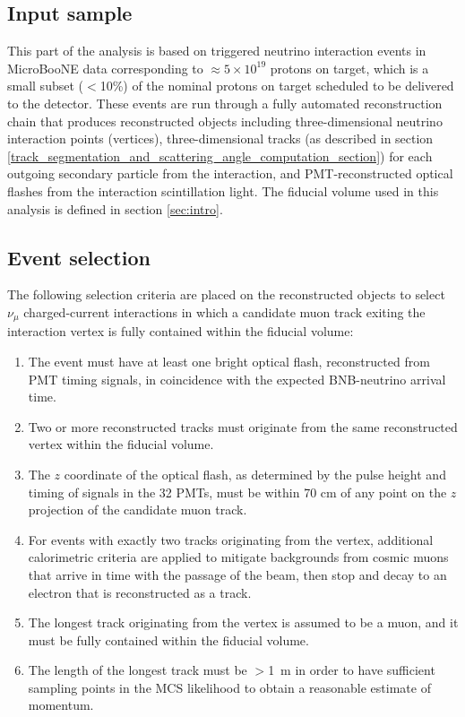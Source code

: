 \documentclass[a4paper,11pt]{article}
\begin{document}
\subsection{Input sample}\label{input_sample_section}
This part of the analysis is based on triggered neutrino interaction events in MicroBooNE data corresponding to $\approx 5 \times 10^{19}$ protons on target, which is a small subset ($<$10\%) of the nominal protons on target scheduled to be delivered to the detector. These events are run through a fully automated reconstruction chain that produces reconstructed objects including three-dimensional neutrino interaction points (vertices), three-dimensional tracks (as described in section \ref{track_segmentation_and_scattering_angle_computation_section}) for each outgoing secondary particle from the interaction, and PMT-reconstructed optical flashes from the interaction scintillation light. The fiducial volume used in this analysis is defined in section \ref{sec:intro}.

\subsection{Event selection}
The following selection criteria are placed on the reconstructed objects to select $\nu_\mu$ charged-current interactions in which a candidate muon track exiting the interaction vertex is fully contained within the fiducial volume:
\begin{enumerate}
\item The event must have at least one bright optical flash, reconstructed from PMT timing signals, in coincidence with the expected BNB-neutrino arrival time.
\item Two or more reconstructed tracks must originate from the same reconstructed vertex within the fiducial volume.
\item The $z$ coordinate of the optical flash, as determined by the pulse height and timing of signals in the 32 PMTs, must be within 70 cm of any point on the $z$ projection of the candidate muon track.
\item For events with exactly two tracks originating from the vertex, additional calorimetric criteria are applied to mitigate backgrounds from cosmic muons that arrive in time with the passage of the beam, then stop and decay to an electron that is reconstructed as a track.
\item The longest track originating from the vertex is assumed to be a muon, and it must be fully contained within the fiducial volume.
\item The length of the longest track must be $>$1~m in order to have sufficient sampling points in the MCS likelihood to obtain a reasonable estimate of momentum.
\end{enumerate}
\end{document}

